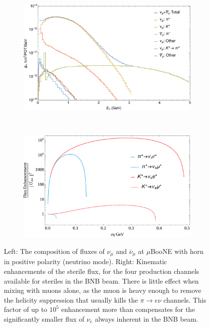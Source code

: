 \documentclass[11pt, a4paper]{article}
\begin{document}
\begin{figure}[t]
\center
\begin{subfigure}[t]{0.5\textwidth}
	\includegraphics[width=\textwidth]{figures/microBooNE_flux.pdf} 
\end{subfigure}%
~
\begin{subfigure}[t]{0.5\textwidth}
	\includegraphics[width=\textwidth]{figures/BNB_flux_enhancement.pdf}
\end{subfigure}
\caption{\label{fig:flux_enhancement} Left: The composition of fluxes of $\nu_\mu$ and $\overline{\nu}_\mu$ at $\mu$BooNE with horn in positive polarity (neutrino mode). Right: Kinematic enhancements of the sterile flux, for the four production channels available for steriles in the BNB beam. There is little effect when mixing with muons alone, as the muon is heavy enough to remove the helicity suppression that usually kills the $\pi\rightarrow e \nu$ channels. This factor of up to $10^5$ enhancement more than compensates for the significantly smaller flux of $\nu_e$ always inherent in the BNB beam.}

\end{figure}
\end{document}
